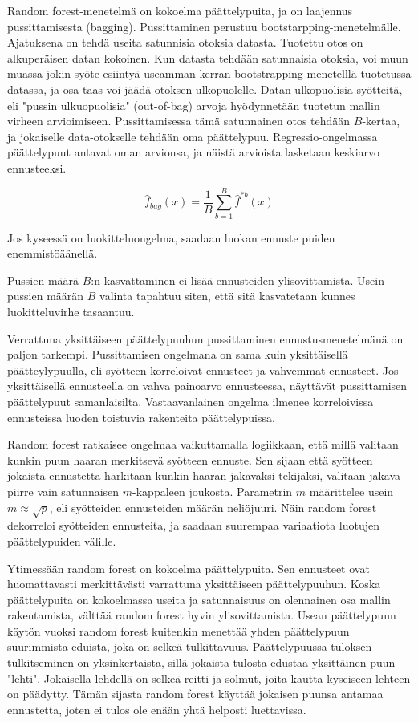 \documentclass[finnish,twoside,openright]{HYgraduMLDS}
\begin{document}
Random forest-menetelmä on kokoelma päättelypuita, ja on laajennus pussittamisesta (bagging)\cite{james2013ISLR}. Pussittaminen perustuu bootstarpping-menetelmälle. Ajatuksena on tehdä useita satunnisia otoksia datasta. Tuotettu otos on alkuperäisen datan kokoinen. Kun datasta tehdään satunnaisia otoksia, voi muun muassa jokin syöte esiintyä useamman kerran bootstrapping-menetelllä tuotetussa datassa, ja osa taas voi jäädä otoksen ulkopuolelle. Datan ulkopuolisia syötteitä, eli "pussin ulkuopuolisia"  (out-of-bag) arvoja hyödynnetään tuotetun mallin virheen arvioimiseen. Pussittamisessa tämä satunnainen otos tehdään $B$-kertaa, ja jokaiselle data-otokselle tehdään oma päättelypuu. Regressio-ongelmassa päättelypuut antavat oman arvionsa, ja näistä arvioista lasketaan keskiarvo ennusteeksi.

\begin{equation}
    \hat{f}_{bag}(x) = \frac{1}{B} \sum^B_{b=1} \hat{f}^{*b}(x)
\end{equation}

Jos kyseessä on luokitteluongelma, saadaan luokan ennuste puiden enemmistöäänellä.\cite{james2013ISLR} 

Pussien määrä $B$:n kasvattaminen ei lisää ennusteiden ylisovittamista\cite{james2013ISLR}. Usein pussien määrän $B$ valinta tapahtuu siten, että sitä kasvatetaan kunnes luokitteluvirhe tasaantuu. 

Verrattuna yksittäiseen päättelypuuhun pussittaminen ennustusmenetelmänä on paljon tarkempi. Pussittamisen ongelmana on sama kuin yksittäisellä päätteylypuulla, eli syötteen korreloivat ennusteet ja vahvemmat ennusteet. Jos yksittäisellä ennusteella on vahva painoarvo ennusteessa, näyttävät pussittamisen päättelypuut samanlaisilta. Vastaavanlainen ongelma ilmenee korreloivissa ennusteissa luoden toistuvia rakenteita päättelypuissa.

Random forest ratkaisee ongelmaa vaikuttamalla logiikkaan, että millä valitaan kunkin puun haaran merkitsevä syötteen ennuste. Sen sijaan että syötteen jokaista ennustetta harkitaan kunkin haaran jakavaksi tekijäksi, valitaan jakava piirre vain satunnaisen $m$-kappaleen joukosta. Parametrin $m$ määrittelee usein $m \approx \sqrt{p}$, eli syötteiden ennusteiden määrän neliöjuuri. Näin random forest dekorreloi syötteiden ennusteita, ja saadaan suurempaa variaatiota luotujen päättelypuiden välille\cite{james2013ISLR}.

Ytimessään random forest on kokoelma päättelypuita. Sen ennusteet ovat huomattavasti merkittävästi varrattuna yksittäiseen päättelypuuhun\cite{james2013ISLR}. Koska päättelypuita on kokoelmassa useita ja satunnaisuus on olennainen osa mallin rakentamista, välttää random forest hyvin ylisovittamista\cite{james2013ISLR}. Usean päättelypuun käytön vuoksi random forest kuitenkin menettää yhden päättelypuun suurimmista eduista, joka on selkeä tulkittavuus\cite{james2013ISLR}. Päättelypuussa tuloksen tulkitseminen on yksinkertaista, sillä jokaista tulosta edustaa yksittäinen puun "lehti". Jokaisella lehdellä on selkeä reitti ja solmut, joita kautta kyseiseen lehteen on päädytty. Tämän sijasta random forest käyttää jokaisen puunsa antamaa ennustetta, joten ei tulos ole enään yhtä helposti luettavissa.
\end{document}
